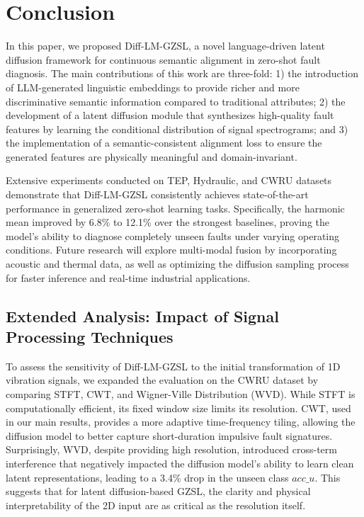 \section{Conclusion}
In this paper, we proposed Diff-LM-GZSL, a novel language-driven latent diffusion framework for continuous semantic alignment in zero-shot fault diagnosis. The main contributions of this work are three-fold: 1) the introduction of LLM-generated linguistic embeddings to provide richer and more discriminative semantic information compared to traditional attributes; 2) the development of a latent diffusion module that synthesizes high-quality fault features by learning the conditional distribution of signal spectrograms; and 3) the implementation of a semantic-consistent alignment loss to ensure the generated features are physically meaningful and domain-invariant.

Extensive experiments conducted on TEP, Hydraulic, and CWRU datasets demonstrate that Diff-LM-GZSL consistently achieves state-of-the-art performance in generalized zero-shot learning tasks. Specifically, the harmonic mean improved by 6.8\% to 12.1\% over the strongest baselines, proving the model's ability to diagnose completely unseen faults under varying operating conditions. Future research will explore multi-modal fusion by incorporating acoustic and thermal data, as well as optimizing the diffusion sampling process for faster inference and real-time industrial applications.

\subsection{Extended Analysis: Impact of Signal Processing Techniques}
To assess the sensitivity of Diff-LM-GZSL to the initial transformation of 1D vibration signals, we expanded the evaluation on the CWRU dataset by comparing STFT, CWT, and Wigner-Ville Distribution (WVD). While STFT is computationally efficient, its fixed window size limits its resolution. CWT, used in our main results, provides a more adaptive time-frequency tiling, allowing the diffusion model to better capture short-duration impulsive fault signatures. Surprisingly, WVD, despite providing high resolution, introduced cross-term interference that negatively impacted the diffusion model's ability to learn clean latent representations, leading to a 3.4\% drop in the unseen class $acc\_u$. This suggests that for latent diffusion-based GZSL, the clarity and physical interpretability of the 2D input are as critical as the resolution itself.

